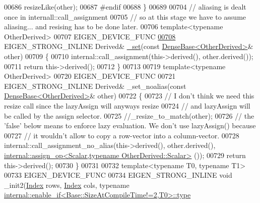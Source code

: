 \begin{DoxyCode}
00686       resizeLike(other);
00687 \textcolor{preprocessor}{      #endif}
00688     \}
00689 
00704     \textcolor{comment}{// aliasing is dealt once in internall::call\_assignment}
00705     \textcolor{comment}{// so at this stage we have to assume aliasing... and resising has to be done later.}
00706     \textcolor{keyword}{template}<\textcolor{keyword}{typename} OtherDerived>
00707     EIGEN\_DEVICE\_FUNC 
\hyperlink{class_eigen_1_1_plain_object_base_aa77dab5e9e6ba9e39740e17cfae78a33}{00708}     EIGEN\_STRONG\_INLINE Derived& \hyperlink{class_eigen_1_1_plain_object_base_aa77dab5e9e6ba9e39740e17cfae78a33}{\_set}(\textcolor{keyword}{const} \hyperlink{group___core___module_class_eigen_1_1_dense_base}{DenseBase<OtherDerived>}& other)
00709     \{
00710       internal::call\_assignment(this->derived(), other.derived());
00711       \textcolor{keywordflow}{return} this->derived();
00712     \}
00713 
00719     \textcolor{keyword}{template}<\textcolor{keyword}{typename} OtherDerived>
00720     EIGEN\_DEVICE\_FUNC 
00721     EIGEN\_STRONG\_INLINE Derived& \_set\_noalias(\textcolor{keyword}{const} \hyperlink{group___core___module_class_eigen_1_1_dense_base}{DenseBase<OtherDerived>}& other)
00722     \{
00723       \textcolor{comment}{// I don't think we need this resize call since the lazyAssign will anyways resize}
00724       \textcolor{comment}{// and lazyAssign will be called by the assign selector.}
00725       \textcolor{comment}{//\_resize\_to\_match(other);}
00726       \textcolor{comment}{// the 'false' below means to enforce lazy evaluation. We don't use lazyAssign() because}
00727       \textcolor{comment}{// it wouldn't allow to copy a row-vector into a column-vector.}
00728       internal::call\_assignment\_no\_alias(this->derived(), other.derived(), 
      \hyperlink{struct_eigen_1_1internal_1_1assign__op}{internal::assign\_op<Scalar,typename OtherDerived::Scalar>}
      ());
00729       \textcolor{keywordflow}{return} this->derived();
00730     \}
00731 
00732     \textcolor{keyword}{template}<\textcolor{keyword}{typename} T0, \textcolor{keyword}{typename} T1>
00733     EIGEN\_DEVICE\_FUNC
00734     EIGEN\_STRONG\_INLINE \textcolor{keywordtype}{void} \_init2(\hyperlink{namespace_eigen_a62e77e0933482dafde8fe197d9a2cfde}{Index} rows, \hyperlink{namespace_eigen_a62e77e0933482dafde8fe197d9a2cfde}{Index} cols, \textcolor{keyword}{typename} 
      \hyperlink{struct_eigen_1_1internal_1_1enable__if}{internal::enable\_if<Base::SizeAtCompileTime!=2,T0>::type}

\end{DoxyCode}

